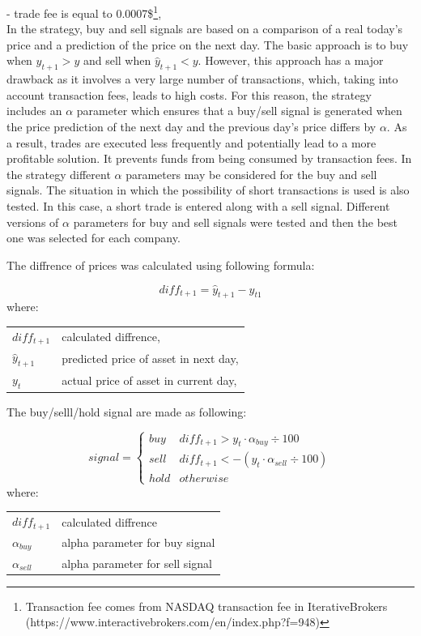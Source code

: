 \documentclass[review]{elsarticle} %
\makeatletter
\newenvironment{conditions}
{\par\vspace{\abovedisplayskip}\noindent\begin{tabular}{>{$}l<{$} @{${}={}$} l}}
       {\end{tabular}\par\vspace{\belowdisplayskip}}
\makeatother
\begin{document}
\noindent- trade fee is equal to 0.0007\$\footnote{Transaction fee comes from NASDAQ transaction fee in IterativeBrokers (https://www.interactivebrokers.com/en/index.php?f=948)}, \\

In the strategy, buy and sell signals are based on a comparison of a real today's price and a prediction of the price on the next day. The basic approach is to buy when $\hat{y}_{t+1} > y$ and sell when $\hat{y}_{t+1} < y$. However, this approach has a major drawback as it involves a very large number of transactions, which, taking into account transaction fees, leads to high costs. For this reason, the strategy includes an $\alpha$ parameter which ensures that a buy/sell signal is generated when the price prediction of the next day and the previous day's price differs by $\alpha$. As a result, trades are executed less frequently and potentially lead to a more profitable solution. It prevents funds from being consumed by transaction fees. In the strategy different $\alpha$ parameters may be considered for the buy and sell signals. The situation in which the possibility of short transactions is used is also tested. In this case, a short trade is entered along with a sell signal. 
Different versions of $\alpha$ parameters for buy and sell signals were tested and then the best one was selected for each company.

\pagebreak
The diffrence of prices was calculated using following formula:

\begin{equation}  diff_{t+1} = \hat{y}_{t+1} - y_{t1} \end{equation}
where:
\begin{conditions}
diff_{t+1} & calculated diffrence, \\ 
 \hat{y}_{t+1}     &   predicted price of asset in next day,\\
 y_{t}     &  actual price of asset in current day,\\   
\end{conditions}

 \begin{flushleft} The buy/selll/hold signal are made as following: \end{flushleft} 
\begin{equation}
signal =  \left\{\begin{array}{ll} buy & diff_{t+1} >  y_{t} \cdot  \alpha_{buy} \div 100 \\ sell & diff_{t+1} <  -(y_{t} \cdot  \alpha_{sell} \div 100)\\  hold & otherwise \end{array}\right.
\end{equation}
where:
\begin{conditions}
diff_{t+1} & calculated diffrence \\ 
\alpha_{buy}     &  alpha parameter for buy signal \\   
\alpha_{sell}     &  alpha parameter for sell signal\\   
\end{conditions}
\end{document}
